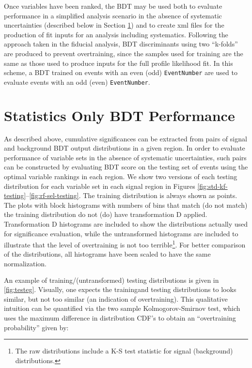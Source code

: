 Once variables have been ranked, the BDT may be used both to evaluate performance in a simplified analysis scenario in the absence of systematic uncertainties (described below in Section \ref{subsec:statonlyperf}) and to create xml files for the production of fit inputs for an analysis including systematics.  Following the approach taken in the fiducial analysis, BDT discriminants using two ``k-folds'' are produced to prevent overtraining, since the samples used for training are the same as those used to produce inputs for the full profile likelihood fit.  In this scheme, a BDT trained on events with an even (odd) \texttt{EventNumber} are used to evaluate events with an odd (even) \texttt{EventNumber}.

\section{Statistics Only BDT Performance}
\label{subsec:statonlyperf}
As described above, cumulative significances can be extracted from pairs of signal and background BDT output distributions in a given region.  In order to evaluate performance of variable sets in the absence of systematic uncertainties, such pairs can be constructed by evaluating BDT score on the testing set of events using the optimal variable rankings in each region.  We show two versions of each testing distribution for each variable set in each signal region in Figures \ref{fig:std-kf-testing}--\ref{fig:rf-sel-testing}.  The training distribution is always shown as points.  The plots with block histograms with numbers of bins that match (do not match) the training distribution do not (do) have transformation D applied.  Transformation D histograms are included to show the distributions actually used for significance evaluation, while the untransformed histograms are included to illustrate that the level of overtraining is not too terrible\footnote{The raw distributions include a K-S test statistic for signal (background) distributions.}.  For better comparison of the distributions, all histograms have been scaled to have the same normalization.

An example of training/(untransformed) testing distributions is given in \ref{fig:testeg}.  Visually, one expects the trainingand testing distributions to looks similar, but not too similar (an indication of overtraining).  This qualitative intuition can be quantified via the two sample Kolmogorov-Smirnov test, which uses the maximum difference in distribution CDF's to obtain an ``overtraining probability'' given by:

